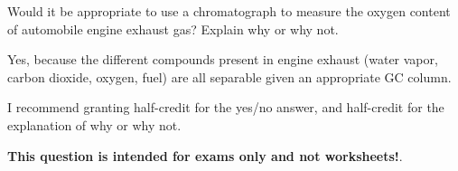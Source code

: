 

Would it be appropriate to use a chromatograph to measure the oxygen content of automobile engine exhaust gas?  Explain why or why not.







Yes, because the different compounds present in engine exhaust (water vapor, carbon dioxide, oxygen, fuel) are all separable given an appropriate GC column.

\vskip 10pt

I recommend granting half-credit for the yes/no answer, and half-credit for the explanation of why or why not.







{\bf This question is intended for exams only and not worksheets!}.



